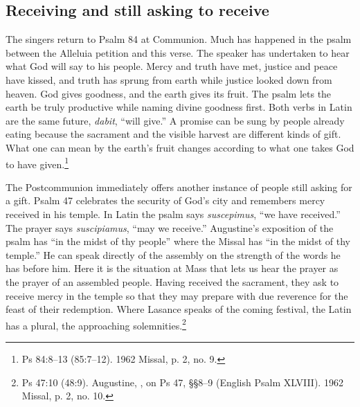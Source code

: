 \subsection{Receiving and still asking to receive}

The singers return to Psalm 84 at Communion. Much has happened in the psalm between the Alleluia petition and this verse. The speaker has undertaken to hear what God will say to his people. Mercy and truth have met, justice and peace have kissed, and truth has sprung from earth while justice looked down from heaven. God gives goodness, and the earth gives its fruit. The psalm lets the earth be truly productive while naming divine goodness first. Both verbs in Latin are the same future, \emph{dabit}, ``will give.'' A promise can be sung by people already eating because the sacrament and the visible harvest are different kinds of gift. What one can mean by the earth's fruit changes according to what one takes God to have given.\footnote{Ps 84:8--13 (85:7--12). 1962 Missal, p. 2, no. 9.}

The Postcommunion immediately offers another instance of people still asking for a gift. Psalm 47 celebrates the security of God's city and remembers mercy received in his temple. In Latin the psalm says \emph{suscepimus}, ``we have received.'' The prayer says \emph{suscipiamus}, ``may we receive.'' Augustine's exposition of the psalm has ``in the midst of thy people'' where the Missal has ``in the midst of thy temple.'' He can speak directly of the assembly on the strength of the words he has before him. Here it is the situation at Mass that lets us hear the prayer as the prayer of an assembled people. Having received the sacrament, they ask to receive mercy in the temple so that they may prepare with due reverence for the feast of their redemption. Where Lasance speaks of the coming festival, the Latin has a plural, the approaching solemnities.\footnote{Ps 47:10 (48:9). Augustine, , on Ps 47, §§8--9 (English Psalm XLVIII). 1962 Missal, p. 2, no. 10.}
